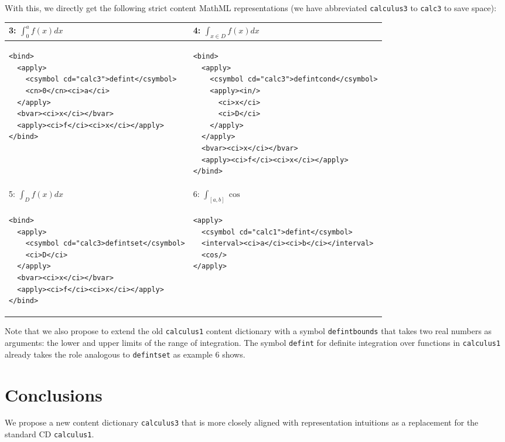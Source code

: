 \documentclass[12pt]{article}
\begin{document}
With this, we directly get the following strict content MathML representations (we have
abbreviated {\texttt{calculus3}} to {\texttt{calc3}} to save space):
\begin{center}\lstset{frame=none,numbers=none,lineskip=-.7ex,aboveskip=-.5em,belowskip=-1em,language=MathML}\begin{tabular}{|p{7.5cm}|p{7.8cm}|}\hline
  3: $\int_0^af(x) dx$ & 4: $\int_{x\in D}f(x) dx$ \\\hline
\begin{lstlisting}
<bind>
  <apply>
    <csymbol cd="calc3">defint</csymbol>
    <cn>0</cn><ci>a</ci>
  </apply>
  <bvar><ci>x</ci></bvar>
  <apply><ci>f</ci><ci>x</ci></apply>
</bind>
\end{lstlisting}
&
\begin{lstlisting}
<bind>
  <apply>
    <csymbol cd="calc3">defintcond</csymbol>
    <apply><in/>
      <ci>x</ci>
      <ci>D</ci>
    </apply>
  </apply>
  <bvar><ci>x</ci></bvar>
  <apply><ci>f</ci><ci>x</ci></apply>
</bind>
\end{lstlisting}
\\\hline\hline
 5: $\int_Df(x)dx$ & 6: $\int_{[a,b]}\cos$\\\hline
\begin{lstlisting}
<bind>
  <apply>
    <csymbol cd="calc3>defintset</csymbol>
    <ci>D</ci>
  </apply>
  <bvar><ci>x</ci></bvar>
  <apply><ci>f</ci><ci>x</ci></apply>
</bind>
\end{lstlisting}
& 
\begin{lstlisting}
<apply>
  <csymbol cd="calc1">defint</csymbol>
  <interval><ci>a</ci><ci>b</ci></interval>
  <cos/>
</apply>
\end{lstlisting}
\\\hline
\end{tabular}
\end{center}

Note that we also propose to extend the old {\texttt{calculus1}} content dictionary with a
symbol {\texttt{defintbounds}} that takes two real numbers as arguments: the lower and
upper limits of the range of integration. The symbol {\texttt{defint}} for definite
integration over functions in {\texttt{calculus1}} already takes the role analogous to
{\texttt{{defintset}}} as example 6 shows. 

\section{Conclusions}

We propose a new content dictionary {\texttt{calculus3}} that is more closely aligned with
{} representation intuitions as a replacement for the {\openmath} standard CD
{\texttt{calculus1}}.
\end{document}
